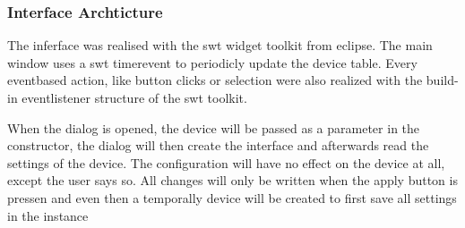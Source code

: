 \subsubsection{Interface Archticture}
The inferface was realised with the swt widget toolkit from eclipse. %
The main window uses a swt timerevent to periodicly update the device table. Every eventbased action, like button clicks or selection were also realized with the build-in eventlistener structure of the swt toolkit. %

When the dialog is opened, the device will be passed as a parameter in the constructor, the dialog will then create the interface and afterwards read the settings of the device. 
The configuration will have no effect on the device at all, except the user says so. All changes will only be written when the apply button is pressen and even then a temporally device will be created to first save all settings in the instance


